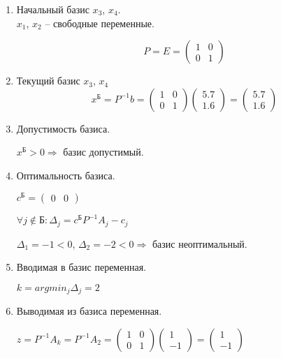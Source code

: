 \begin{enumerate}
\begin{enumerate}

	\item Начальный базис $x_3$, $x_4$.\\
	 $x_1$, $x_2$ -- свободные переменные.
	
	\begin{displaymath}
		P = E = \begin{pmatrix}
			1 & 0 \\ 0 & 1
		\end{pmatrix}
	\end{displaymath}

	\item Текущий базис $x_3$, $x_4$\\
	\begin{displaymath}
		x^{\text{Б}} = P^{-1}b = \begin{pmatrix}
			1 & 0 \\ 0 & 1
		\end{pmatrix}
		\begin{pmatrix}
			5.7 \\ 1.6
		\end{pmatrix}
		=
		\begin{pmatrix}
			5.7 \\ 1.6
		\end{pmatrix}
	\end{displaymath}

	\item Допустимость базиса.
	
	$x^{\text{Б}} > 0 \Rightarrow$ базис допустимый.

	\item Оптимальность базиса.
	
	$c^\text{Б} = \begin{pmatrix}
		0 & 0
	\end{pmatrix}$

	$\forall j \notin \text{Б} : \Delta_j = c^\text{Б} P^{-1} A_j - c_j$

	$\Delta_1 = -1 < 0$, $\Delta_2 = -2 < 0 \Rightarrow$ базис неоптимальный.

	\item Вводимая в базис переменная.
	
	$k = argmin_j \Delta_j = 2$
	
	\item Выводимая из базиса переменная.
	
	$z = P^{-1} A_k = P^{-1} A_2 = \begin{pmatrix}
		1 & 0 \\ 0 & 1
	\end{pmatrix}
	\begin{pmatrix}
		1 \\ -1
	\end{pmatrix}
	=
	\begin{pmatrix}
		1 \\ -1
	\end{pmatrix}$
	

\end{enumerate}
\end{enumerate}
